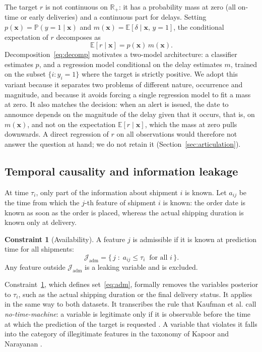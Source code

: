 \documentclass[11pt,a4paper]{article}
\newcommand{\E}{\mathbb{E}}
\newcommand{\Prob}{\mathbb{P}}
\theoremstyle{definition}
\newtheorem{contrainte}{Constraint}
\begin{document}
The target $r$ is not continuous on $\mathbb{R}_+$: it has a probability mass at zero (all on-time or early deliveries) and a continuous part for delays. Setting $p(\mathbf{x}) = \Prob(y=1 \mid \mathbf{x})$ and $m(\mathbf{x}) = \E[\delta \mid \mathbf{x},\, y=1]$, the conditional expectation of $r$ decomposes as
\begin{equation}
  \E[r \mid \mathbf{x}] = p(\mathbf{x})\, m(\mathbf{x}).
  \label{eq:decomp}
\end{equation}
Decomposition~\eqref{eq:decomp} motivates a two-model architecture: a classifier estimates $p$, and a regression model conditional on the delay estimates $m$, trained on the subset $\{i : y_i = 1\}$ where the target is strictly positive. We adopt this variant because it separates two problems of different nature, occurrence and magnitude, and because it avoids forcing a single regression model to fit a mass at zero. It also matches the decision: when an alert is issued, the date to announce depends on the magnitude of the delay given that it occurs, that is, on $m(\mathbf{x})$, and not on the expectation $\E[r \mid \mathbf{x}]$, which the mass at zero pulls downwards. A direct regression of $r$ on all observations would therefore not answer the question at hand; we do not retain it (Section~\ref{sec:articulation}).

\subsection{Temporal causality and information leakage}
\label{sec:causalite}

At time $\tau_i$, only part of the information about shipment $i$ is known. Let $a_{ij}$ be the time from which the $j$-th feature of shipment $i$ is known: the order date is known as soon as the order is placed, whereas the actual shipping duration is known only at delivery.

\begin{contrainte}[Availability]
\label{ctr:dispo}
A feature $j$ is admissible if it is known at prediction time for all shipments:
\begin{equation}
  \mathcal{J}_{\mathrm{adm}} = \bigl\{\, j \;:\; a_{ij} \le \tau_i \ \text{ for all } i \,\bigr\}.
  \label{eq:adm}
\end{equation}
Any feature outside $\mathcal{J}_{\mathrm{adm}}$ is a leaking variable and is excluded.
\end{contrainte}

Constraint~\ref{ctr:dispo}, which defines set~\eqref{eq:adm}, formally removes the variables posterior to $\tau_i$, such as the actual shipping duration or the final delivery status. It applies in the same way to both datasets. It transcribes the rule that Kaufman et al. call \emph{no-time-machine}: a variable is legitimate only if it is observable before the time at which the prediction of the target is requested \cite{kaufman2012leakage}. A variable that violates it falls into the category of illegitimate features in the taxonomy of Kapoor and Narayanan \cite{kapoor2023leakage}.
\end{document}

